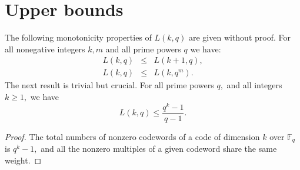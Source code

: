 \documentclass[12pt]{article}
\newcommand{\F}{\mathbb{F}}
\theoremstyle{definition}
\begin{document}
\section{Upper bounds}
The following monotonicity properties of $L(k,q)$ are given without proof.
{\prop For all nonegative integers $k,m$ and all prime powers $q$ we have:
\begin{eqnarray*}
L(k,q)&\le & L(k+1,q),\\
L(k,q)&\le & L(k,q^m).
\end{eqnarray*}
}
The next result is trivial but crucial.
{\prop \label{prop1} For all prime powers $q,$ and all integers $k\ge 1,$ we have
$$L(k,q)\le \frac{q^k-1}{q-1}.$$
}\vspace{-0.8cm}
\begin{proof}
The total numbers of nonzero codewords of a code of dimension $k$ over $\F_q$ is $q^k-1,$ and all the nonzero multiples of a given codeword share the same weight.
\end{proof}
\end{document}
